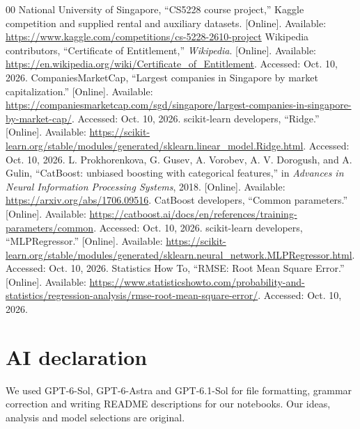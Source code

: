 \documentclass[conference]{IEEEtran}
\begin{document}
\clearpage
\begin{thebibliography}{00}
  National University of Singapore, ``CS5228 course project,'' Kaggle
  competition and supplied rental and auxiliary datasets. [Online].
  Available: \url{https://www.kaggle.com/competitions/cs-5228-2610-project}
  Wikipedia contributors, ``Certificate of Entitlement,'' \textit{Wikipedia}.
  [Online]. Available:
  \url{https://en.wikipedia.org/wiki/Certificate_of_Entitlement}.
  Accessed: Oct. 10, 2026.
  CompaniesMarketCap, ``Largest companies in Singapore by market
  capitalization.'' [Online]. Available:
  \url{https://companiesmarketcap.com/sgd/singapore/largest-companies-in-singapore-by-market-cap/}.
  Accessed: Oct. 10, 2026.
  scikit-learn developers, ``Ridge.'' [Online]. Available:
  \url{https://scikit-learn.org/stable/modules/generated/sklearn.linear_model.Ridge.html}.
  Accessed: Oct. 10, 2026.
  L. Prokhorenkova, G. Gusev, A. Vorobev, A. V. Dorogush, and A. Gulin,
  ``CatBoost: unbiased boosting with categorical features,''
  in \textit{Advances in Neural Information Processing Systems}, 2018.
  [Online]. Available: \url{https://arxiv.org/abs/1706.09516}.
  CatBoost developers, ``Common parameters.'' [Online]. Available:
  \url{https://catboost.ai/docs/en/references/training-parameters/common}.
  Accessed: Oct. 10, 2026.
  scikit-learn developers, ``MLPRegressor.'' [Online]. Available:
  \url{https://scikit-learn.org/stable/modules/generated/sklearn.neural_network.MLPRegressor.html}.
  Accessed: Oct. 10, 2026.
  Statistics How To, ``RMSE: Root Mean Square Error.'' [Online]. Available:
  \url{https://www.statisticshowto.com/probability-and-statistics/regression-analysis/rmse-root-mean-square-error/}.
  Accessed: Oct. 10, 2026.
\end{thebibliography}

\section*{AI declaration}
We used GPT-6-Sol, GPT-6-Astra and GPT-6.1-Sol for file formatting, grammar
correction and writing README descriptions for our notebooks. Our ideas,
analysis and model selections are original.
\end{document}
